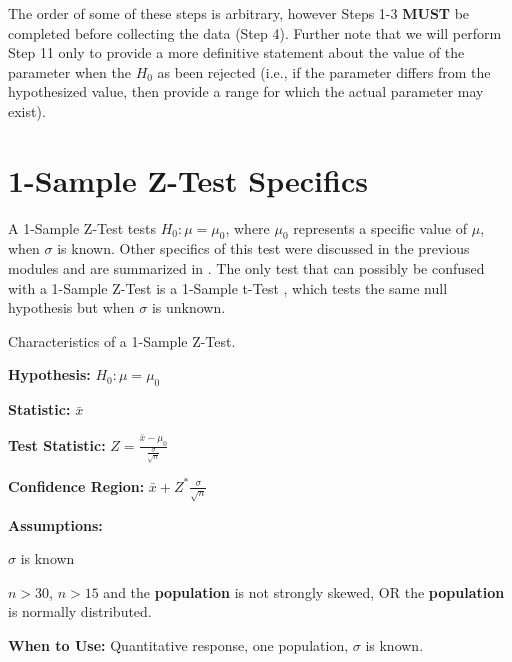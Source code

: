 \documentclass[10pt,openany]{book}\usepackage[]{graphicx}\usepackage[]{color}
\begin{document}
The order of some of these steps is arbitrary, however Steps 1-3 \textbf{MUST} be completed before collecting the data (Step 4). Further note that we will perform Step 11 only to provide a more definitive statement about the value of the parameter when the $H_{0}$ as been rejected (i.e., if the parameter differs from the hypothesized value, then provide a range for which the actual parameter may exist).



\section{1-Sample Z-Test Specifics} \label{sect:ZTest}
\vspace{-12pt}
A 1-Sample Z-Test tests $H_{0}:\mu=\mu_{0}$, where $\mu_{0}$ represents a specific value of $\mu$, when $\sigma$ is known. Other specifics of this test were discussed in the previous modules and are summarized in .  The only test that can possibly be confused with a 1-Sample Z-Test is a 1-Sample t-Test , which tests the same null hypothesis but when $\sigma$ is unknown.

\begin{table}[h]
\centering
\colorbox{ltgray}{
\begin{minipage}{.8\textwidth}
  \centering
	\caption{Characteristics of a 1-Sample Z-Test.}\label{tab:1Zspec}
  \begin{Itemize}
      \item \textbf{Hypothesis:} $H_{0}:\mu=\mu_{0}$
      \item \textbf{Statistic:} $\bar{x}$
      \vspace{6pt}
      \item \textbf{Test Statistic:} $Z=\frac{\bar{x}-\mu_{0}}{\frac{\sigma}{\sqrt{n}}}$
      \vspace{6pt}
      \item \textbf{Confidence Region:} $\bar{x}+Z^{*}\frac{\sigma}{\sqrt{n}}$
      \vspace{6pt}
      \item \textbf{Assumptions:}
        \begin{Enumerate}
          \item $\sigma$ is known
          \item $n>30$, $n>15$ and the \textbf{population} is not strongly skewed, OR the \textbf{population} is normally distributed.
        \end{Enumerate}
      \item \textbf{When to Use:} Quantitative response, one population, $\sigma$ is known.
  \end{Itemize}
\end{minipage}}
\end{table}
\end{document}
